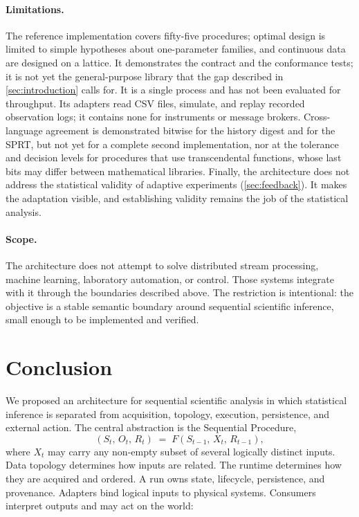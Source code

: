 \documentclass[11pt,a4paper]{article}
\theoremstyle{definition}
\theoremstyle{remark}
\begin{document}
\paragraph{Limitations.}
The reference implementation covers fifty-five procedures; optimal
design is limited to simple hypotheses about one-parameter families, and
continuous data are designed on a lattice. It demonstrates the contract and the
conformance tests; it is not yet the general-purpose library that the
gap described in \cref{sec:introduction} calls for. It is a single
process and has not been evaluated for throughput. Its adapters read
CSV files, simulate, and replay recorded observation logs; it contains
none for instruments or message brokers. Cross-language agreement is
demonstrated bitwise for the history digest and for the SPRT, but not
yet for a complete second implementation, nor at the tolerance and
decision levels for procedures that use transcendental functions, whose
last bits may differ between mathematical libraries. Finally, the architecture
does not address the statistical validity of adaptive experiments
(\cref{sec:feedback}). It makes the adaptation visible, and establishing
validity remains the job of the statistical analysis.

\paragraph{Scope.}
The architecture does not attempt to solve distributed stream
processing, machine learning, laboratory automation, or control. Those
systems integrate with it through the boundaries described above. The
restriction is intentional: the objective is a stable semantic boundary
around sequential scientific inference, small enough to be implemented
and verified.

\section{Conclusion}
\label{sec:conclusion}

We proposed an architecture for sequential scientific analysis in which
statistical inference is separated from acquisition, topology,
execution, persistence, and external action. The central abstraction is
the Sequential Procedure,
\[
(S_t,\,O_t,\,R_t) \;=\; F(S_{t-1},\,X_t,\,R_{t-1}),
\]
where $X_t$ may carry any non-empty subset of several logically distinct
inputs. Data topology determines how inputs are related. The runtime
determines how they are acquired and ordered. A run owns state,
lifecycle, persistence, and provenance. Adapters bind logical inputs to
physical systems. Consumers interpret outputs and may act on the world:
\end{document}
